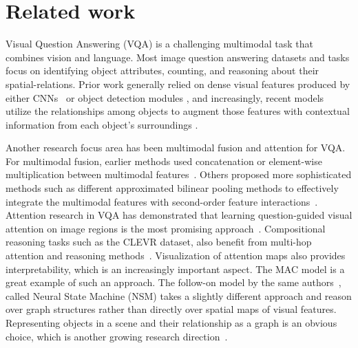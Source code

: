 

\section{Related work}
Visual Question Answering (VQA) is a challenging multimodal task that combines vision and language.  Most image question answering datasets and tasks focus on identifying object attributes, counting, and reasoning about their spatial-relations. Prior work generally relied on dense visual features produced by either CNNs~\cite{xiong2016dynamic,yang2016stacked} or object detection modules \cite{desta2018object}, and increasingly, recent models utilize the relationships among objects to augment those features with contextual information from each object’s surroundings \cite{teney2017graph, santoro2017simple}.  

Another research focus area has been multimodal fusion and attention for VQA. For multimodal fusion, earlier methods used concatenation or element-wise multiplication between multimodal features~\cite{zhou2015simple, antol2015}. Others proposed more sophisticated methods such as different approximated bilinear pooling methods to effectively integrate the multimodal features with second-order feature interactions~\cite{fukui2016multimodal, kim2016hadamard}. Attention research in VQA has demonstrated that learning question-guided visual attention on image regions is the most promising approach~\cite{yang2016stacked, chen2015abc, ilievski2016focused}. Compositional reasoning tasks such as the CLEVR dataset, also benefit from multi-hop attention and reasoning methods~\cite{hudson2018compositional, song2018explore}. Visualization of attention maps also provides interpretability, which is an increasingly important aspect. The MAC model \cite{hudson2018compositional} is a great example of such an approach. The follow-on model by the same authors~\cite{hudson2019learning}, called Neural State Machine (NSM) takes a slightly different approach and reason over graph structures rather than directly over spatial maps of visual features.  Representing objects in a scene and their relationship as a graph is an obvious choice, which is another growing research direction~\cite{haurilet2019s, teney2017graph, kim2018dynamic}. 

